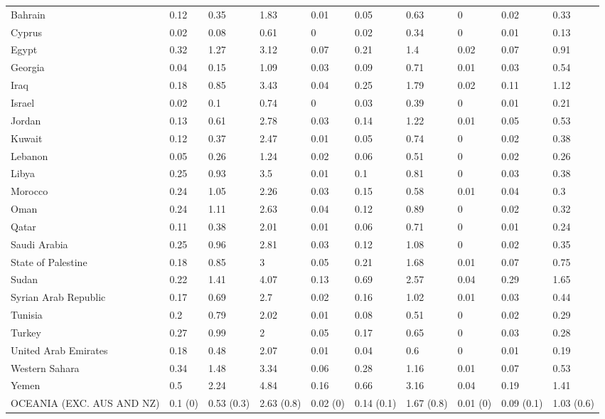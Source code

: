 \begin{longtable}[t]{llllllllll}
Bahrain & 0.12 & 0.35 & 1.83 & 0.01 & 0.05 & 0.63 & 0 & 0.02 & 0.33\\
Cyprus & 0.02 & 0.08 & 0.61 & 0 & 0.02 & 0.34 & 0 & 0.01 & 0.13\\
Egypt & 0.32 & 1.27 & 3.12 & 0.07 & 0.21 & 1.4 & 0.02 & 0.07 & 0.91\\
Georgia & 0.04 & 0.15 & 1.09 & 0.03 & 0.09 & 0.71 & 0.01 & 0.03 & 0.54\\
Iraq & 0.18 & 0.85 & 3.43 & 0.04 & 0.25 & 1.79 & 0.02 & 0.11 & 1.12\\
Israel & 0.02 & 0.1 & 0.74 & 0 & 0.03 & 0.39 & 0 & 0.01 & 0.21\\
Jordan & 0.13 & 0.61 & 2.78 & 0.03 & 0.14 & 1.22 & 0.01 & 0.05 & 0.53\\
Kuwait & 0.12 & 0.37 & 2.47 & 0.01 & 0.05 & 0.74 & 0 & 0.02 & 0.38\\
Lebanon & 0.05 & 0.26 & 1.24 & 0.02 & 0.06 & 0.51 & 0 & 0.02 & 0.26\\
Libya & 0.25 & 0.93 & 3.5 & 0.01 & 0.1 & 0.81 & 0 & 0.03 & 0.38\\
Morocco & 0.24 & 1.05 & 2.26 & 0.03 & 0.15 & 0.58 & 0.01 & 0.04 & 0.3\\
Oman & 0.24 & 1.11 & 2.63 & 0.04 & 0.12 & 0.89 & 0 & 0.02 & 0.32\\
Qatar & 0.11 & 0.38 & 2.01 & 0.01 & 0.06 & 0.71 & 0 & 0.01 & 0.24\\
Saudi Arabia & 0.25 & 0.96 & 2.81 & 0.03 & 0.12 & 1.08 & 0 & 0.02 & 0.35\\
State of Palestine & 0.18 & 0.85 & 3 & 0.05 & 0.21 & 1.68 & 0.01 & 0.07 & 0.75\\
Sudan & 0.22 & 1.41 & 4.07 & 0.13 & 0.69 & 2.57 & 0.04 & 0.29 & 1.65\\
Syrian Arab Republic & 0.17 & 0.69 & 2.7 & 0.02 & 0.16 & 1.02 & 0.01 & 0.03 & 0.44\\
Tunisia & 0.2 & 0.79 & 2.02 & 0.01 & 0.08 & 0.51 & 0 & 0.02 & 0.29\\
Turkey & 0.27 & 0.99 & 2 & 0.05 & 0.17 & 0.65 & 0 & 0.03 & 0.28\\
United Arab Emirates & 0.18 & 0.48 & 2.07 & 0.01 & 0.04 & 0.6 & 0 & 0.01 & 0.19\\
Western Sahara & 0.34 & 1.48 & 3.34 & 0.06 & 0.28 & 1.16 & 0.01 & 0.07 & 0.53\\
Yemen & 0.5 & 2.24 & 4.84 & 0.16 & 0.66 & 3.16 & 0.04 & 0.19 & 1.41\\
OCEANIA (EXC. AUS AND NZ) & 0.1 (0) & 0.53 (0.3) & 2.63 (0.8) & 0.02 (0) & 0.14 (0.1) & 1.67 (0.8) & 0.01 (0) & 0.09 (0.1) & 1.03 (0.6)\\

\end{longtable}
